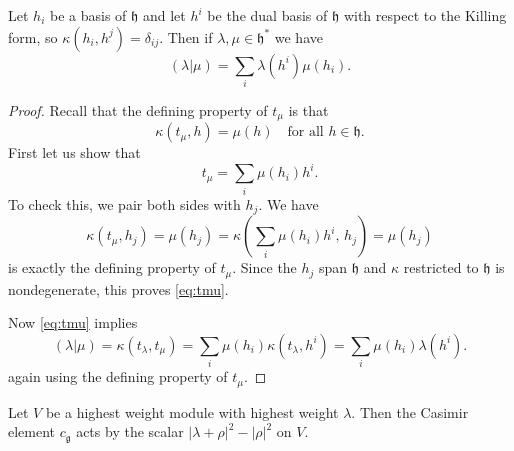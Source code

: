 \documentclass[12pt]{article}
\begin{document}
\begin{proposition}
    Let $h_i$ be a basis of $\mathfrak{h}$ and let $h^i$ be the dual basis of $\mathfrak{h}$
    with respect to the Killing form, so $\kappa(h_i, h^j) = \delta_{ij}$.
    Then if $\lambda, \mu \in \mathfrak{h}^*$ we have
    \[
        (\lambda | \mu) = \sum_i \lambda(h^i)\mu(h_i).
    \]
\end{proposition}

\begin{proof}
    Recall that the defining property of $t_\mu$ is that
    \[
        \kappa(t_\mu, h) = \mu(h) \quad \text{for all } h \in \mathfrak{h}.
    \]
    First let us show that
    \begin{equation}\label{eq:tmu}
        t_\mu = \sum_i \mu(h_i) h^i.
    \end{equation}
    To check this, we pair both sides with $h_j$. We have
    \[
        \kappa(t_\mu, h_j) = \mu(h_j) =
        \kappa\!\left( \sum_i \mu(h_i) h^i,\, h_j \right) = \mu(h_j)
    \]
    is exactly the defining property of $t_\mu$. Since the $h_j$ span $\mathfrak{h}$ and $\kappa$ restricted to $\mathfrak{h}$ is nondegenerate, this proves \eqref{eq:tmu}.

    Now \eqref{eq:tmu} implies
    \[
        (\lambda|\mu) = \kappa(t_\lambda, t_\mu)
        = \sum_i \mu(h_i)\kappa(t_\lambda, h^i)
        = \sum_i \mu(h_i)\lambda(h^i).
    \]
    again using the defining property of $t_\mu$.
\end{proof}

\begin{proposition}
    Let $V$ be a highest weight module with highest weight $\lambda$.
    Then the Casimir element $c_{\mathfrak{g}}$ acts by the scalar $|\lambda + \rho|^2 - |\rho|^2$ on $V$.
\end{proposition}
\end{document}
